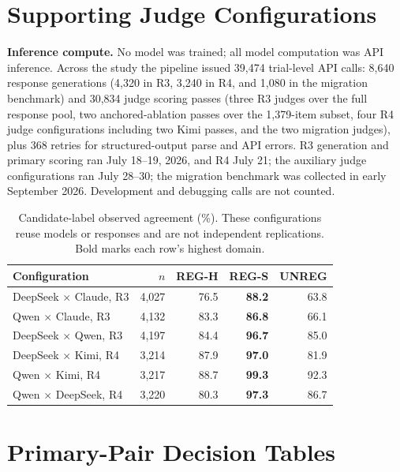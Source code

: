\documentclass[11pt]{article}
\begin{document}
\section{Supporting Judge Configurations}
\label{app:crossjudge}

\textbf{Inference compute.} No model was trained; all model computation was API inference. Across the study the pipeline issued 39{,}474 trial-level API calls: 8{,}640 response generations (4{,}320 in R3, 3{,}240 in R4, and 1{,}080 in the migration benchmark) and 30{,}834 judge scoring passes (three R3 judges over the full response pool, two anchored-ablation passes over the 1{,}379-item subset, four R4 judge configurations including two Kimi passes, and the two migration judges), plus 368 retries for structured-output parse and API errors. R3 generation and primary scoring ran July 18--19, 2026, and R4 July 21; the auxiliary judge configurations ran July 28--30; the migration benchmark was collected in early September 2026. Development and debugging calls are not counted.

\begin{table}[H]
\centering
\scriptsize
\setlength{\tabcolsep}{2.6pt}
\begin{tabular}{@{}lrrrr@{}}
\toprule
Configuration & $n$ & REG-H & REG-S & UNREG \\
\midrule
DeepSeek $\times$ Claude, R3 & 4,027 & 76.5 & \textbf{88.2} & 63.8 \\
Qwen $\times$ Claude, R3 & 4,132 & 83.3 & \textbf{86.8} & 66.1 \\
DeepSeek $\times$ Qwen, R3 & 4,197 & 84.4 & \textbf{96.7} & 85.0 \\
DeepSeek $\times$ Kimi, R4 & 3,214 & 87.9 & \textbf{97.0} & 81.9 \\
Qwen $\times$ Kimi, R4 & 3,217 & 88.7 & \textbf{99.3} & 92.3 \\
Qwen $\times$ DeepSeek, R4 & 3,220 & 80.3 & \textbf{97.3} & 86.7 \\
\bottomrule
\end{tabular}
\caption{Candidate-label observed agreement (\%). These configurations reuse models or responses and are not independent replications. Bold marks each row's highest domain.}
\end{table}

\section{Primary-Pair Decision Tables}
\label{app:contingency}
\end{document}
